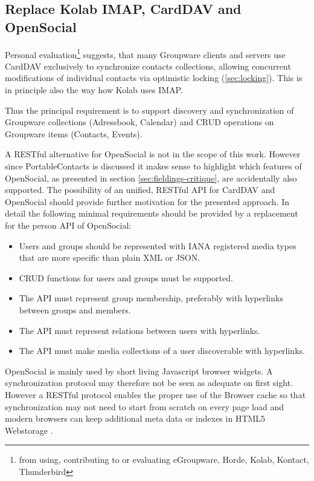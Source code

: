 \documentclass[11pt,a4paper,headsepline,twoside]{scrartcl}		%
\begin{document}


\subsection{Replace Kolab IMAP, CardDAV and OpenSocial}
\label{sec:replacement-carddav}

Personal evaluation\footnote{from using, contributing to or evaluating
  eGroupware, Horde, Kolab, Kontact, Thunderbird} suggests, that many Groupware
clients and servers use CardDAV exclusively to synchronize contacts collections,
allowing concurrent modifications of individual contacts via optimistic locking
(\autoref{sec:locking}). This is in principle also the way how Kolab uses IMAP.

Thus the principal requirement is to support discovery and synchronization of
Groupware collections (Adressbook, Calendar) and CRUD operations on Groupware
items (Contacts, Events).

A RESTful alternative for OpenSocial is not in the scope of this work. However
since PortableContacts is discussed it makes sense to highlight which features
of OpenSocial, as presented in section \ref{sec:fieldings-critique}, are
accidentally also supported. The possibility of an unified, RESTful API for
CardDAV and OpenSocial should provide further motivation for the presented
approach. In detail the following minimal requirements should be provided by a
replacement for the person API of OpenSocial:

\begin{itemize}
\item Users and groups should be represented with IANA registered media types
  that are more specific than plain XML or JSON.
\item CRUD functions for users and groups must be supported.
\item The API must represent group membership, preferably with hyperlinks
  between groups and members.
\item The API must represent relations between users with hyperlinks.
\item The API must make media collections of a user discoverable with
  hyperlinks.
\end{itemize}

OpenSocial is mainly used by short living Javascript browser widgets. A
synchronization protocol may therefore not be seen as adequate on first
sight. However a RESTful protocol enables the proper use of the Browser cache so
that synchronization may not need to start from scratch on every page load and
modern browsers can keep additional meta data or indexes in HTML5
Webstorage \cite{Hickson2011b}.
\end{document}
